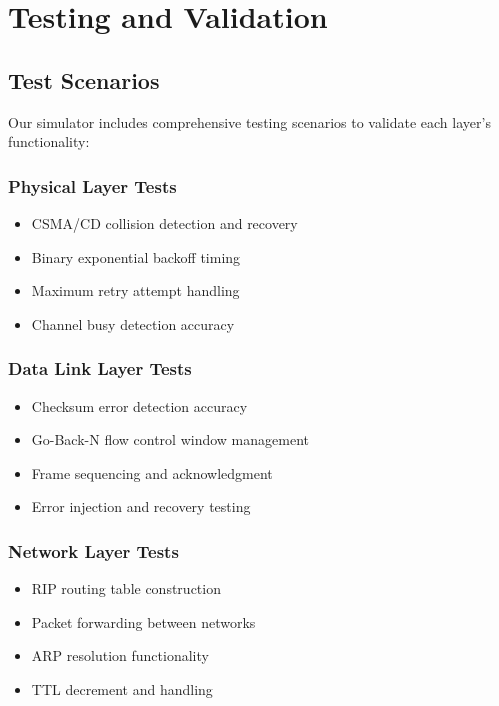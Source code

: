 \documentclass[12pt,a4paper]{article}
\begin{document}
\newpage

\section{Testing and Validation}

\subsection{Test Scenarios}

Our simulator includes comprehensive testing scenarios to validate each layer's functionality:

\subsubsection{Physical Layer Tests}
\begin{itemize}
\item CSMA/CD collision detection and recovery
\item Binary exponential backoff timing
\item Maximum retry attempt handling
\item Channel busy detection accuracy
\end{itemize}

\subsubsection{Data Link Layer Tests}
\begin{itemize}
\item Checksum error detection accuracy
\item Go-Back-N flow control window management
\item Frame sequencing and acknowledgment
\item Error injection and recovery testing
\end{itemize}

\subsubsection{Network Layer Tests}
\begin{itemize}
\item RIP routing table construction
\item Packet forwarding between networks
\item ARP resolution functionality
\item TTL decrement and handling
\end{itemize}
\end{document}
